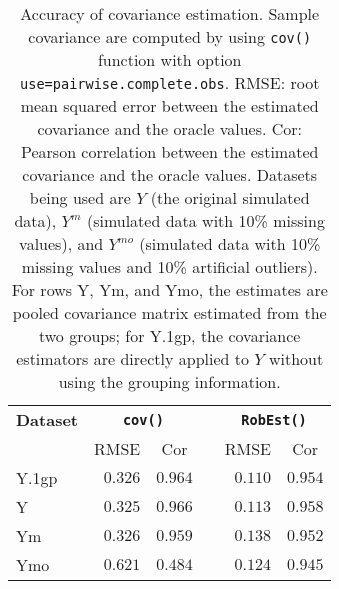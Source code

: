 \begin{table}[!tbp]
\caption{Accuracy of covariance estimation. Sample covariance are computed by using \texttt{cov()} function with option \texttt{use=pairwise.complete.obs}. RMSE: root mean squared error between the estimated covariance and the oracle values. Cor: Pearson correlation between the estimated covariance and the oracle values. Datasets being used are $Y$ (the original simulated data), $Y^{m}$ (simulated data with 10\% missing values), and $Y^{mo}$ (simulated data with 10\% missing values and 10\% artificial outliers). For rows Y, Ym, and Ymo, the estimates are pooled covariance matrix estimated from the two groups; for Y.1gp, the covariance estimators are directly applied to $Y$ without using the grouping information.\label{tab:sim1-est}} 
\begin{center}
\begin{tabular}{lrrcrr}
\hline\hline
\multicolumn{1}{l}{\bfseries Dataset}&\multicolumn{2}{c}{\bfseries \texttt{cov()}}&\multicolumn{1}{c}{\bfseries }&\multicolumn{2}{c}{\bfseries \texttt{RobEst()}}\tabularnewline
\cline{2-3} \cline{5-6}
\multicolumn{1}{l}{}&\multicolumn{1}{c}{RMSE}&\multicolumn{1}{c}{Cor}&\multicolumn{1}{c}{}&\multicolumn{1}{c}{RMSE}&\multicolumn{1}{c}{Cor}\tabularnewline
\hline
Y.1gp&$0.326$&$0.964$&&$0.110$&$0.954$\tabularnewline
Y&$0.325$&$0.966$&&$0.113$&$0.958$\tabularnewline
Ym&$0.326$&$0.959$&&$0.138$&$0.952$\tabularnewline
Ymo&$0.621$&$0.484$&&$0.124$&$0.945$\tabularnewline
\hline
\end{tabular}\end{center}
\end{table}
